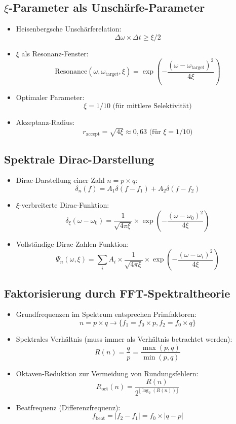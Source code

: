 \documentclass[12pt,a4paper]{article}
\begin{document}
	\subsection{$\xi$-Parameter als Unsch\"{a}rfe-Parameter}
	\begin{itemize}
		\item Heisenbergsche Unsch\"{a}rferelation:
		$$\Delta\omega \times \Delta t \geq \xi/2$$
		
		\item $\xi$ als Resonanz-Fenster:
		$$\text{Resonance}(\omega, \omega_{\text{target}}, \xi) = \exp\left(-\frac{(\omega-\omega_{\text{target}})^2}{4\xi}\right)$$
		
		\item Optimaler Parameter:
		$$\xi = 1/10 \text{ (f\"{u}r mittlere Selektivit\"{a}t)}$$
		
		\item Akzeptanz-Radius:
		$$r_{\text{accept}} = \sqrt{4\xi} \approx 0,63 \text{ (f\"{u}r } \xi = 1/10)$$
	\end{itemize}
	
	\subsection{Spektrale Dirac-Darstellung}
	\begin{itemize}
		\item Dirac-Darstellung einer Zahl $n = p \times q$:
		$$\delta_n(f) = A_1\delta(f - f_1) + A_2\delta(f - f_2)$$
		
		\item $\xi$-verbreiterte Dirac-Funktion:
		$$\delta_\xi(\omega - \omega_0) = \frac{1}{\sqrt{4\pi\xi}} \times \exp\left(-\frac{(\omega-\omega_0)^2}{4\xi}\right)$$
		
		\item Vollst\"{a}ndige Dirac-Zahlen-Funktion:
		$$\Psi_n(\omega,\xi) = \sum_i A_i \times \frac{1}{\sqrt{4\pi\xi}} \times \exp\left(-\frac{(\omega-\omega_i)^2}{4\xi}\right)$$
	\end{itemize}
	
	\subsection{Faktorisierung durch FFT-Spektraltheorie}
	\begin{itemize}
		\item Grundfrequenzen im Spektrum entsprechen Primfaktoren:
		$$n = p \times q \rightarrow \{f_1 = f_0 \times p, f_2 = f_0 \times q\}$$
		
		\item Spektrales Verh\"{a}ltnis (muss immer als Verh\"{a}ltnis betrachtet werden):
		$$R(n) = \frac{q}{p} = \frac{\max(p,q)}{\min(p,q)}$$
		
		\item Oktaven-Reduktion zur Vermeidung von Rundungsfehlern:
		$$R_{\text{oct}}(n) = \frac{R(n)}{2^{\lfloor\log_2(R(n))\rfloor}}$$
		
		\item Beatfrequenz (Differenzfrequenz):
		$$f_{\text{beat}} = |f_2 - f_1| = f_0 \times |q - p|$$
	\end{itemize}
	
\end{document}
